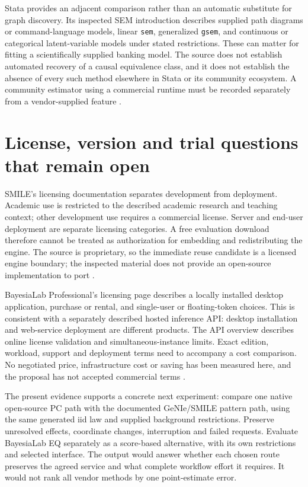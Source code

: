 Stata provides an adjacent comparison rather than an automatic substitute for
graph discovery. Its inspected SEM introduction describes supplied path
diagrams or command-language models, linear \texttt{sem}, generalized
\texttt{gsem}, and continuous or categorical latent-variable models under
stated restrictions. These can matter for fitting a scientifically supplied
banking model. The source does not establish automated recovery of a causal
equivalence class, and it does not establish the absence of every such method
elsewhere in Stata or its community ecosystem. A community estimator using a
commercial runtime must be recorded separately from a vendor-supplied feature
\citep{exec13_stata_sem}.

\section{License, version and trial questions that remain open}

SMILE's licensing documentation separates development from deployment.
Academic use is restricted to the described academic research and teaching
context; other development use requires a commercial license. Server and
end-user deployment are separate licensing categories. A free evaluation
download therefore cannot be treated as authorization for embedding and
redistributing the engine. The source is proprietary, so the immediate reuse
candidate is a licensed engine boundary; the inspected material does not
provide an open-source implementation to port
\citep{exec13_smile_license}.

BayesiaLab Professional's licensing page describes a locally installed desktop
application, purchase or rental, and single-user or floating-token choices.
This is consistent with a separately described hosted inference API: desktop
installation and web-service deployment are different products. The API
overview describes online license validation and simultaneous-instance limits.
Exact edition, workload, support and deployment terms need to accompany a
cost comparison. No negotiated price, infrastructure cost or saving has been
measured here, and the proposal has not accepted commercial terms
\citep{exec13_bayesia_professional,exec13_bayesia_api}.

The present evidence supports a concrete next experiment: compare one
native open-source PC path with the documented GeNIe/SMILE pattern path,
using the same generated iid law and supplied background restrictions.
Preserve unresolved effects, coordinate changes, interruption and failed
requests. Evaluate BayesiaLab EQ separately as a score-based alternative,
with its own restrictions and selected interface. The output would answer
whether each chosen route preserves the agreed service and what complete
workflow effort it requires. It would not rank all vendor methods by one
point-estimate error.

